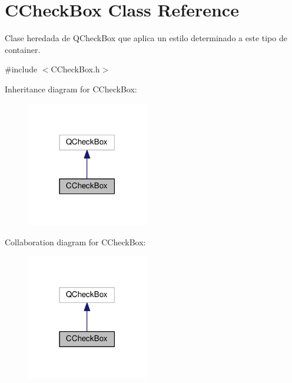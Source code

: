 \hypertarget{classCCheckBox}{}\section{C\+Check\+Box Class Reference}
\label{classCCheckBox}


Clase heredada de \textquotesingle{}Q\+Check\+Box\textquotesingle{} que aplica un estilo determinado a este tipo de container.  




{\ttfamily \#include $<$C\+Check\+Box.\+h$>$}



Inheritance diagram for C\+Check\+Box\+:
\nopagebreak
\begin{figure}[H]
\begin{center}
\leavevmode
\includegraphics[width=150pt]{classCCheckBox__inherit__graph}
\end{center}
\end{figure}


Collaboration diagram for C\+Check\+Box\+:
\nopagebreak
\begin{figure}[H]
\begin{center}
\leavevmode
\includegraphics[width=150pt]{classCCheckBox__coll__graph}
\end{center}
\end{figure}
